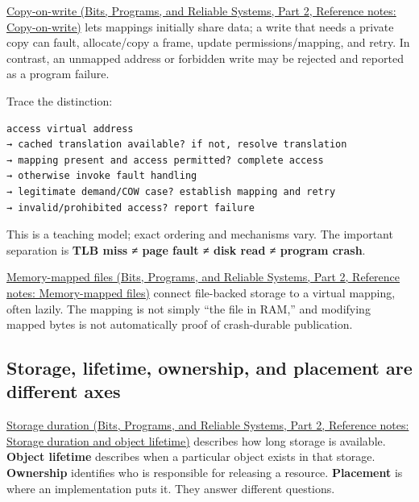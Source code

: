 \href{../01-Bits-Programs-and-Reliable-Systems-P02/main.pdf\#appendix-7a06e5baac04}{Copy-on-write (Bits, Programs, and Reliable Systems, Part 2, Reference notes: Copy-on-write)} lets mappings initially share data; a write that needs a private copy can fault, allocate/copy a frame, update permissions/mapping, and retry. In contrast, an unmapped address or forbidden write may be rejected and reported as a program failure.

Trace the distinction:

\begin{verbatim}
access virtual address
→ cached translation available? if not, resolve translation
→ mapping present and access permitted? complete access
→ otherwise invoke fault handling
→ legitimate demand/COW case? establish mapping and retry
→ invalid/prohibited access? report failure
\end{verbatim}

This is a teaching model; exact ordering and mechanisms vary. The important separation is \textbf{TLB miss ≠ page fault ≠ disk read ≠ program crash}.

\href{../01-Bits-Programs-and-Reliable-Systems-P02/main.pdf\#appendix-313ee7a0ba7b}{Memory-mapped files (Bits, Programs, and Reliable Systems, Part 2, Reference notes: Memory-mapped files)} connect file-backed storage to a virtual mapping, often lazily. The mapping is not simply ``the file in RAM,'' and modifying mapped bytes is not automatically proof of crash-durable publication.

\subsection{Storage, lifetime, ownership, and placement are different axes}\label{05-engine-i-ch002-storage-lifetime-ownership-and-placement-are-different-axes}

\hypertarget{05-engine-i-ch002-storage-lifetime-ownership-and-placement-are-different-axes}{}

\href{../01-Bits-Programs-and-Reliable-Systems-P02/main.pdf\#appendix-0b104bcba06b}{Storage duration (Bits, Programs, and Reliable Systems, Part 2, Reference notes: Storage duration and object lifetime)} describes how long storage is available. \textbf{Object lifetime} describes when a particular object exists in that storage. \textbf{Ownership} identifies who is responsible for releasing a resource. \textbf{Placement} is where an implementation puts it. They answer different questions.

